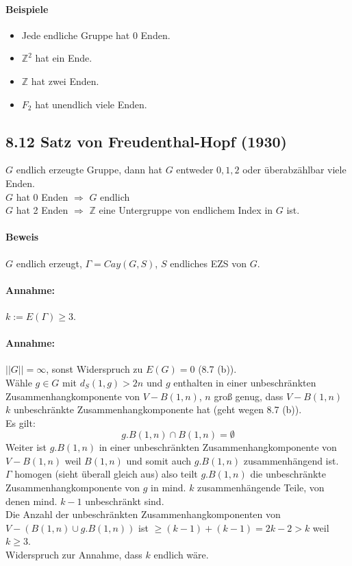 \documentclass{article}
\newcommand{\Z}{\mathbb{Z}}
\newcommand{\norm}[1]{\left|\left|#1\right|\right|}
\begin{document}
\paragraph{Beispiele}
\begin{itemize}
	\item Jede endliche Gruppe hat 0 Enden.
	\item $\Z^2$ hat ein Ende.
	\item $\Z$ hat zwei Enden.
	\item $F_2$ hat unendlich viele Enden.
\end{itemize}

\subsection{8.12 Satz von Freudenthal-Hopf (1930)}
$G$ endlich erzeugte Gruppe, dann hat $G$ entweder $0,1,2$ oder überabzählbar viele Enden.\\
$G$ hat 0 Enden $\Longrightarrow$ $G$ endlich\\
$G$ hat 2 Enden $\Longrightarrow$ $\Z$ eine Untergruppe von endlichem Index in $G$ ist.

\paragraph{Beweis}
$G$ endlich erzeugt, $\Gamma = Cay(G,S)$, $S$ endliches EZS von $G$.

\paragraph{Annahme:} $k := E(\Gamma) \geq 3$.
\paragraph{Annahme:} $\norm{G} = \infty$, sonst Widerspruch zu $E(G) = 0$ (8.7 (b)).\\
Wähle $g\in G$ mit $d_S(1,g) > 2n$ und $g$ enthalten in einer unbeschränkten Zusammenhangkomponente von $V- B(1,n)$, $n$ groß genug, dass $V-B(1,n)$ $k$ unbeschränkte Zusammenhangkomponente hat (geht wegen 8.7 (b)).\\
Es gilt:
\[g.B(1,n) \cap B(1,n) = \emptyset \]
Weiter ist $g.B(1,n)$ in einer unbeschränkten Zusammenhangkomponente von $V-B(1,n)$ weil $B(1,n)$ und somit auch $g.B(1,n)$ zusammenhängend ist.\\
$\Gamma$ homogen (sieht überall gleich aus) also teilt $g.B(1,n)$ die unbeschränkte Zusammenhangkomponente von $g$ in mind. $k$ zusammenhängende Teile, von denen mind. $k-1$ unbeschränkt sind.\\
Die Anzahl der unbeschränkten Zusammenhangkomponenten von $V- (B(1,n) \cup g.B(1,n))$ ist $\geq (k-1) + (k-1) = 2k - 2 > k$ weil $k \geq 3$.\\
Widerspruch zur Annahme, dass $k$ endlich wäre.\\
\end{document}
